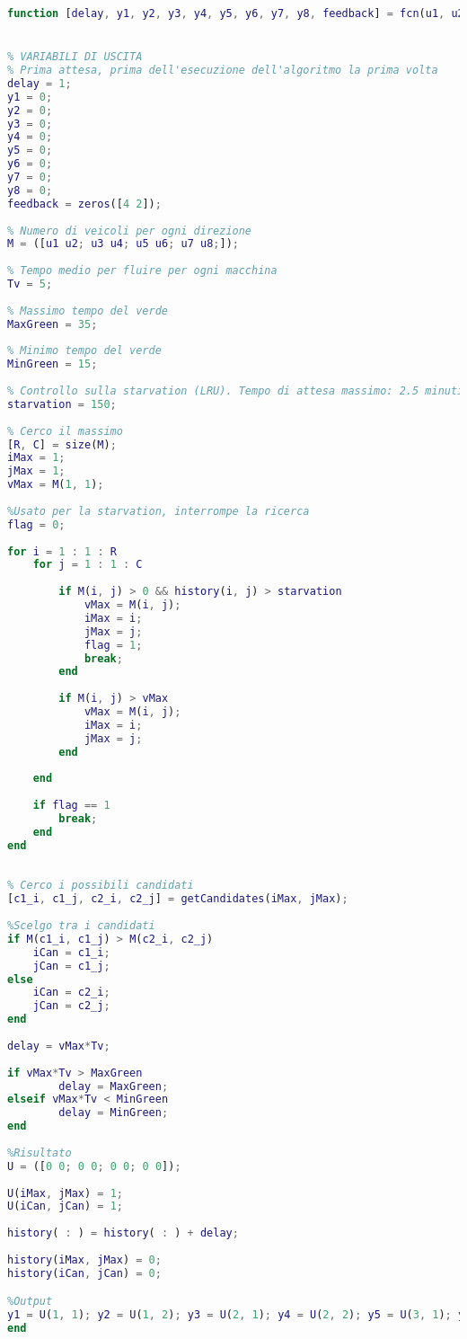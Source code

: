 \begin{lstlisting}[language=Matlab,label=algoritmodin,caption=Implementazione dell'algoritmo di gestione dinamica di un singolo incrocio]
function [delay, y1, y2, y3, y4, y5, y6, y7, y8, feedback] = fcn(u1, u2, u3, u4, u5, u6, u7, u8, history)


% VARIABILI DI USCITA
% Prima attesa, prima dell'esecuzione dell'algoritmo la prima volta
delay = 1; 
y1 = 0; 
y2 = 0; 
y3 = 0; 
y4 = 0; 
y5 = 0; 
y6 = 0; 
y7 = 0;
y8 = 0;
feedback = zeros([4 2]);
 
% Numero di veicoli per ogni direzione
M = ([u1 u2; u3 u4; u5 u6; u7 u8;]);
 
% Tempo medio per fluire per ogni macchina
Tv = 5;
 
% Massimo tempo del verde
MaxGreen = 35;
 
% Minimo tempo del verde
MinGreen = 15;
 
% Controllo sulla starvation (LRU). Tempo di attesa massimo: 2.5 minuti
starvation = 150;
 
% Cerco il massimo
[R, C] = size(M);
iMax = 1;
jMax = 1;
vMax = M(1, 1);
 
%Usato per la starvation, interrompe la ricerca
flag = 0;
 
for i = 1 : 1 : R
    for j = 1 : 1 : C
        
        if M(i, j) > 0 && history(i, j) > starvation
            vMax = M(i, j);
            iMax = i;
            jMax = j;
            flag = 1;
            break;
        end
 
        if M(i, j) > vMax
            vMax = M(i, j);
            iMax = i;
            jMax = j;
        end
       
    end
    
    if flag == 1
        break;
    end
end
 
 
% Cerco i possibili candidati
[c1_i, c1_j, c2_i, c2_j] = getCandidates(iMax, jMax);
 
%Scelgo tra i candidati
if M(c1_i, c1_j) > M(c2_i, c2_j) 
    iCan = c1_i;
    jCan = c1_j;
else
    iCan = c2_i;
    jCan = c2_j;
end
 
delay = vMax*Tv;
 
if vMax*Tv > MaxGreen
        delay = MaxGreen;
elseif vMax*Tv < MinGreen
        delay = MinGreen;
end
    
%Risultato
U = ([0 0; 0 0; 0 0; 0 0]);
 
U(iMax, jMax) = 1;
U(iCan, jCan) = 1;
     
history( : ) = history( : ) + delay;
    
history(iMax, jMax) = 0;
history(iCan, jCan) = 0;

%Output 
y1 = U(1, 1); y2 = U(1, 2); y3 = U(2, 1); y4 = U(2, 2); y5 = U(3, 1); y6 = U(3, 2); y7 = U(4, 1); y8 = U(4, 2); feedback(:) = history(:);
end
    
\end{lstlisting}
\newpage
